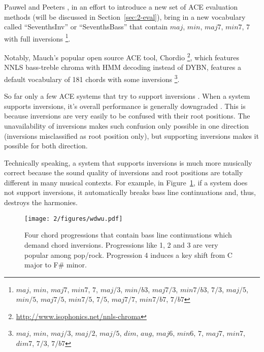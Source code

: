 Pauwel and Peeters \cite{pauwels2013evaluating}, in an effort to introduce a new set of ACE evaluation methods (will be discussed in Section~\ref{sec:2-eval}), bring in a new vocabulary called ``SeventhsInv'' or ``SeventhsBass'' that contain $maj$, $min$, $maj7$, $min7$, $7$ with full inversions \footnote{$maj$, $min$, $maj7$, $min7$, $7$, $maj/3$, $min/b3$, $maj7/3$, $min7/b3$, $7/3$, $maj/5$, $min/5$, $maj7/5$, $min7/5$, $7/5$, $maj7/7$, $min7/b7$, $7/b7$}.

Notably, Mauch's popular open source ACE tool, Chordio \cite{cannam2010sonic} \footnote{\url{http://www.isophonics.net/nnls-chroma}}, which features NNLS bass-treble chroma with HMM decoding instead of DYBN, features a default vocabulary of 181 chords with some inversions \footnote{$maj$, $min$, $maj/3$, $maj/2$, $maj/5$, $dim$, $aug$, $maj6$, $min6$, $7$, $maj7$, $min7$, $dim7$, $7/3$, $7/b7$}.


So far only a few ACE systems that try to support inversions \cite{cannam2010sonic,mauch2010automatic,ni2012end,mcvicar2013machine,deng2016chord,deng2016hybrid}. When a system supports inversions, it's overall performance is generally downgraded \cite{deng2016chord}. This is because inversions are very easily to be confused with their root positions. The unavailability of inversions makes such confusion only possible in one direction (inversions misclassified as root position only), but supporting inversions makes it possible for both direction.

Technically speaking, a system that supports inversions is much more musically correct because the sound quality of inversions and root positions are totally different in many musical contexts. For example, in Figure~\ref{fig:2-wdwu}, if a system does not support inversions, it automatically breaks bass line continuations and, thus, destroys the harmonies.
\begin{figure}[htb]
\centering
\texttt{[image: 2/figures/wdwu.pdf]}
\caption{Four chord progressions that contain bass line continuations which demand chord inversions. Progressions like 1, 2 and 3 are very popular among pop/rock. Progression 4 induces a key shift from C major to F\# minor.}
\label{fig:2-wdwu}
\end{figure}

